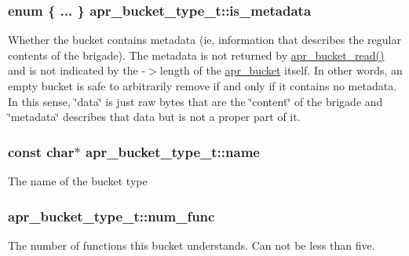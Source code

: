 \subsubsection[{\texorpdfstring{is\+\_\+metadata}{is_metadata}}]{\setlength{\rightskip}{0pt plus 5cm}enum \{ ... \}   apr\+\_\+bucket\+\_\+type\+\_\+t\+::is\+\_\+metadata}\hypertarget{structapr__bucket__type__t_a1a0d40943c081b8ea5f11810b66ae7b9}{}\label{structapr__bucket__type__t_a1a0d40943c081b8ea5f11810b66ae7b9}
Whether the bucket contains metadata (ie, information that describes the regular contents of the brigade). The metadata is not returned by \hyperlink{group__APR__Util__Bucket__Brigades_gae44ae938c6c60e148430fdb098dcf28f}{apr\+\_\+bucket\+\_\+read()} and is not indicated by the -\/$>$length of the \hyperlink{structapr__bucket}{apr\+\_\+bucket} itself. In other words, an empty bucket is safe to arbitrarily remove if and only if it contains no metadata. In this sense, \char`\"{}data\char`\"{} is just raw bytes that are the \char`\"{}content\char`\"{} of the brigade and \char`\"{}metadata\char`\"{} describes that data but is not a proper part of it. 
\subsubsection[{\texorpdfstring{name}{name}}]{\setlength{\rightskip}{0pt plus 5cm}const char$\ast$ apr\+\_\+bucket\+\_\+type\+\_\+t\+::name}\hypertarget{structapr__bucket__type__t_ac6d779be45de214c6abd2cc205c48901}{}\label{structapr__bucket__type__t_ac6d779be45de214c6abd2cc205c48901}
The name of the bucket type 
\subsubsection[{\texorpdfstring{num\+\_\+func}{num_func}}]{ apr\+\_\+bucket\+\_\+type\+\_\+t\+::num\+\_\+func}\hypertarget{structapr__bucket__type__t_ad4bd2ffb03cb2f5f3b3941ce20468038}{}\label{structapr__bucket__type__t_ad4bd2ffb03cb2f5f3b3941ce20468038}
The number of functions this bucket understands. Can not be less than five. 
